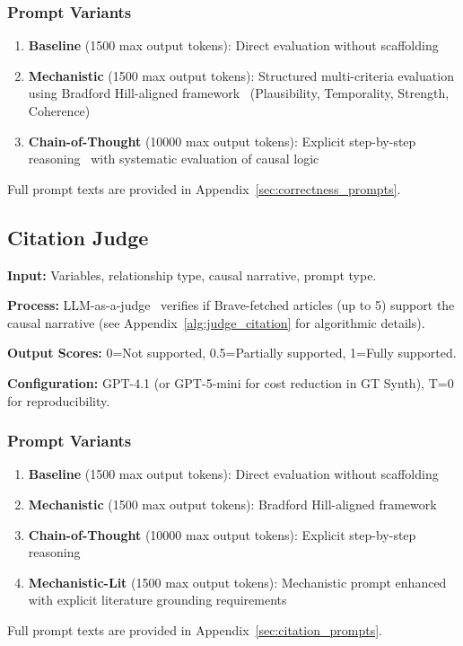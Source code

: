 \subsubsection{Prompt Variants}
\begin{enumerate}[noitemsep]
    \item \textbf{Baseline} (1500 max output tokens): Direct evaluation without scaffolding
    \item \textbf{Mechanistic} (1500 max output tokens): Structured multi-criteria evaluation using Bradford Hill-aligned framework~\cite{shimonovich2020bradford} (Plausibility, Temporality, Strength, Coherence)
    \item \textbf{Chain-of-Thought} (10000 max output tokens): Explicit step-by-step reasoning~\cite{kojima2022large} with systematic evaluation of causal logic
\end{enumerate}
Full prompt texts are provided in Appendix~\ref{sec:correctness_prompts}.

\subsection{Citation Judge}
\label{sec:citation_judge}

\textbf{Input:} Variables, relationship type, causal narrative, prompt type.

\textbf{Process:} LLM-as-a-judge~\cite{zheng2024llmasajudge} verifies if Brave-fetched articles (up to 5) support the causal narrative (see Appendix~\ref{alg:judge_citation} for algorithmic details).

\textbf{Output Scores:} 0=Not supported, 0.5=Partially supported, 1=Fully supported.

\textbf{Configuration:} GPT-4.1 (or GPT-5-mini for cost reduction in GT Synth), T=0 for reproducibility.

\subsubsection{Prompt Variants}
\begin{enumerate}[noitemsep]
    \item \textbf{Baseline} (1500 max output tokens): Direct evaluation without scaffolding
    \item \textbf{Mechanistic} (1500 max output tokens): Bradford Hill-aligned framework
    \item \textbf{Chain-of-Thought} (10000 max output tokens): Explicit step-by-step reasoning
    \item \textbf{Mechanistic-Lit} (1500 max output tokens): Mechanistic prompt enhanced with explicit literature grounding requirements
\end{enumerate}
Full prompt texts are provided in Appendix~\ref{sec:citation_prompts}.

